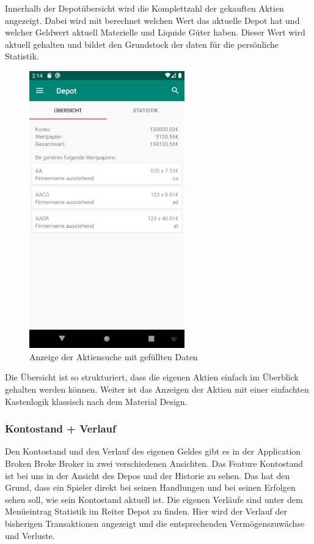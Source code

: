 \documentclass[10pt]{scrartcl}
\begin{document}
Innerhalb der Depotübersicht wird die Komplettzahl der gekauften Aktien angezeigt. Dabei wird mit berechnet welchen Wert das aktuelle Depot hat und welcher Geldwert aktuell Materielle und Liquide Güter haben. Dieser Wert wird aktuell gehalten und bildet den Grundstock der daten für die persönliche Statistik.


\begin{figure}[H]
	\centering
	\includegraphics[width=0.6\textwidth]{Bilder/Prsi/depot.png}
	\caption{Anzeige der Aktiensuche mit gefüllten Daten}
\end{figure}
 
Die Übersicht ist so strukturiert, dass die eigenen Aktien einfach im Überblick gehalten werden können. Weiter ist das Anzeigen der Aktien mit einer einfachten Kastenlogik klassisch nach dem Material Design.

\subsubsection{Kontostand + Verlauf}

Den Kontostand und den Verlauf des eigenen Geldes gibt es in der Application Broken Broke Broker in zwei verschiedenen Ansichten. Das Feature Kontostand ist bei uns in der Ansicht des Depos und der Historie zu sehen. Das hat den Grund, dass ein Spieler direkt bei seinen Handlungen und bei seinen Erfolgen sehen soll, wie sein Kontostand aktuell ist. Die eigenen Verläufe sind unter dem Menüeintrag Statistik im Reiter Depot zu finden. Hier wird der Verlauf der bisherigen Transaktionen angezeigt und die entsprechenden Vermögenszuwächse und Verluste. 
\end{document}
